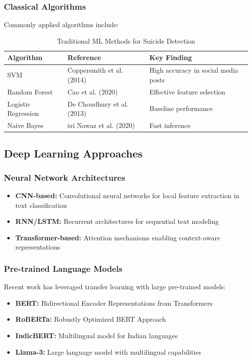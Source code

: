 \documentclass[12pt,a4paper]{article}
\begin{document}
\subsubsection{Classical Algorithms}
Commonly applied algorithms include:
\begin{table}[H]
\centering
\caption{Traditional ML Methods for Suicide Detection}
\label{tab:traditional_ml}
\begin{tabular}{@{}lll@{}}
\toprule
\textbf{Algorithm} & \textbf{Reference} & \textbf{Key Finding} \\
\midrule
SVM & Coppersmith et al. (2014) & High accuracy in social media posts \\
Random Forest & Cao et al. (2020) & Effective feature selection \\
Logistic Regression & De Choudhury et al. (2013) & Baseline performance \\
Naive Bayes &ṡri Nawaz et al. (2020) & Fast inference \\
\bottomrule
\end{tabular}
\end{table}

\subsection{Deep Learning Approaches}

\subsubsection{Neural Network Architectures}
\begin{itemize}
    \item \textbf{CNN-based:} Convolutional neural networks for local feature extraction in text classification \cite{kim2014}
    \item \textbf{RNN/LSTM:} Recurrent architectures for sequential text modeling \cite{hochreiter1997}
    \item \textbf{Transformer-based:} Attention mechanisms enabling context-aware representations \cite{vaswani2017}
\end{itemize}

\subsubsection{Pre-trained Language Models}
Recent work has leveraged transfer learning with large pre-trained models:
\begin{itemize}
    \item \textbf{BERT:} Bidirectional Encoder Representations from Transformers \cite{devlin2019}
    \item \textbf{RoBERTa:} Robustly Optimized BERT Approach \cite{liu2019}
    \item \textbf{IndicBERT:} Multilingual model for Indian languages \cite{kwatra2023}
    \item \textbf{Llama-3:} Large language model with multilingual capabilities \cite{meta2024}
\end{itemize}
\end{document}

